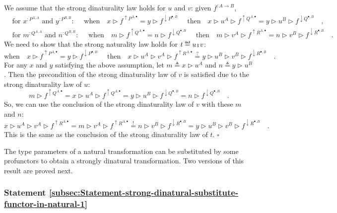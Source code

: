 We assume that the strong dinaturality law holds for $u$ and $v$:
given $f^{:A\rightarrow B}$,
\begin{align*}
 & \text{for }x^{:P^{A,A}}\text{ and }y^{:P^{B,B}}:\quad\text{ when}\quad x\triangleright f^{\uparrow P^{A,\bullet}}=y\triangleright f^{\downarrow P^{\bullet,B}}\quad\text{ then}\quad x\triangleright u^{A}\triangleright f^{\uparrow Q^{A,\bullet}}=y\triangleright u^{B}\triangleright f^{\downarrow Q^{\bullet,B}}\quad,\\
 & \text{for }m^{:Q^{A,A}}\text{ and }n^{:Q^{B,B}}:\quad\text{ when}\quad m\triangleright f^{\uparrow Q^{A,\bullet}}=n\triangleright f^{\downarrow Q^{\bullet,B}}\quad\text{ then}\quad m\triangleright v^{A}\triangleright f^{\uparrow R^{A,\bullet}}=n\triangleright v^{B}\triangleright f^{\downarrow R^{\bullet,B}}\quad.
\end{align*}
We need to show that the strong naturality law holds for $t\triangleq u\bef v$:
\[
\text{when}\quad x\triangleright f^{\uparrow P^{A,\bullet}}=y\triangleright f^{\downarrow P^{\bullet,B}}\quad\text{ then}\quad x\triangleright u^{A}\triangleright v^{A}\triangleright f^{\uparrow R^{A,\bullet}}\overset{?}{=}y\triangleright u^{B}\triangleright v^{B}\triangleright f^{\downarrow R^{\bullet,B}}\quad.
\]
For any $x$ and $y$ satisfying the above assumption, let $m\triangleq x\triangleright u^{A}$
and $n\triangleq y\triangleright u^{B}$. Then the precondition of
the strong dinaturality law of $v$ is satisfied due to the strong
dinaturality law of $u$:
\[
m\triangleright f^{\uparrow Q^{A,\bullet}}=x\triangleright u^{A}\triangleright f^{\uparrow Q^{A,\bullet}}=y\triangleright u^{B}\triangleright f^{\downarrow Q^{\bullet,B}}=n\triangleright f^{\downarrow Q^{\bullet,B}}\quad.
\]
So, we can use the conclusion of the strong dinaturality law of $v$
with these $m$ and $n$:
\[
x\triangleright u^{A}\triangleright v^{A}\triangleright f^{\uparrow R^{A,\bullet}}=m\triangleright v^{A}\triangleright f^{\uparrow R^{A,\bullet}}\overset{!}{=}n\triangleright v^{B}\triangleright f^{\downarrow R^{\bullet,B}}=y\triangleright u^{B}\triangleright v^{B}\triangleright f^{\downarrow R^{\bullet,B}}\quad.
\]
This is the same as the conclusion of the strong dinaturality law
of $t$. $\square$

The type parameters of a natural transformation can be substituted
by some profunctors to obtain a strongly dinatural transformation.
Two versions of this result are proved next.

\subsubsection{Statement \label{subsec:Statement-strong-dinatural-substitute-functor-in-natural-1}\ref{subsec:Statement-strong-dinatural-substitute-functor-in-natural-1}}


